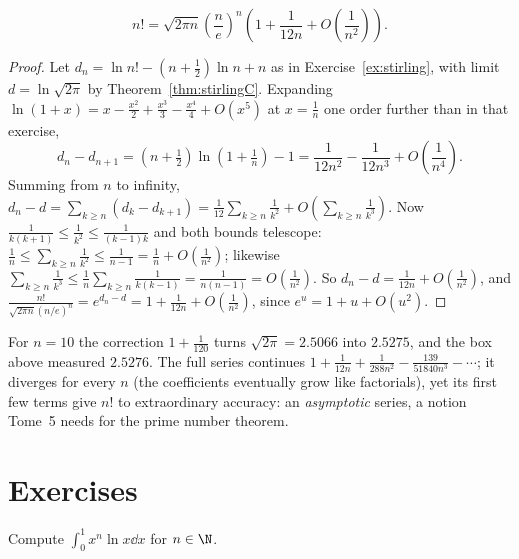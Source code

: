 \begin{proposition}\label{prop:stirlingnext}
\[n!=\sqrt{2\pi n}\left(\frac ne\right)^n\left(1+\frac1{12n}+O\!\left(\frac1{n^2}\right)\right).\]
\end{proposition}
\begin{proof}
Let $d_n=\ln n!-\left(n+\frac12\right)\ln n+n$ as in Exercise~\ref{ex:stirling}, with limit $d=\ln\sqrt{2\pi}$ by Theorem~\ref{thm:stirlingC}. Expanding $\ln(1+x)=x-\frac{x^2}2+\frac{x^3}3-\frac{x^4}4+O(x^5)$ at $x=\frac1n$ one order further than in that exercise,
\[
d_n-d_{n+1}=\left(n+\tfrac12\right)\ln\left(1+\tfrac1n\right)-1=\frac1{12n^2}-\frac1{12n^3}+O\!\left(\frac1{n^4}\right).
\]
Summing from $n$ to infinity, $d_n-d=\sum_{k\ge n}(d_k-d_{k+1})=\frac1{12}\sum_{k\ge n}\frac1{k^2}+O\!\left(\sum_{k\ge n}\frac1{k^3}\right)$. Now $\frac1{k(k+1)}\le\frac1{k^2}\le\frac1{(k-1)k}$ and both bounds telescope: $\frac1n\le\sum_{k\ge n}\frac1{k^2}\le\frac1{n-1}=\frac1n+O\left(\frac1{n^2}\right)$; likewise $\sum_{k\ge n}\frac1{k^3}\le\frac1{n}\sum_{k\ge n}\frac1{k(k-1)}=\frac1{n(n-1)}=O\left(\frac1{n^2}\right)$. So $d_n-d=\frac1{12n}+O\left(\frac1{n^2}\right)$, and $\frac{n!}{\sqrt{2\pi n}(n/e)^n}=e^{d_n-d}=1+\frac1{12n}+O\left(\frac1{n^2}\right)$, since $e^u=1+u+O(u^2)$.
\end{proof}

For $n=10$ the correction $1+\frac1{120}$ turns $\sqrt{2\pi}=2.5066$ into $2.5275$, and the box above measured $2.5276$. The full series continues $1+\frac1{12n}+\frac1{288n^2}-\frac{139}{51840n^3}-\cdots$; it diverges for every $n$ (the coefficients eventually grow like factorials), yet its first few terms give $n!$ to extraordinary accuracy: an \emph{asymptotic} series, a notion Tome~5 needs for the prime number theorem.


\section{Exercises}

\begin{exercise}[$\star$]\label{ex:xnlnx}
Compute $\displaystyle\int_0^1x^n\ln x\dd x$ for $n\in\N$.
\end{exercise}

